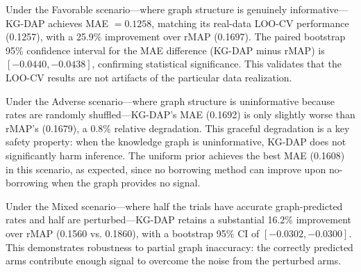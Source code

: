 \documentclass[12pt]{article}
\begin{document}
Under the Favorable scenario---where graph structure is genuinely informative---KG-DAP achieves MAE $= 0.1258$, matching its real-data LOO-CV performance (0.1257), with a 25.9\% improvement over rMAP (0.1697). The paired bootstrap 95\% confidence interval for the MAE difference (KG-DAP minus rMAP) is $[-0.0440, -0.0438]$, confirming statistical significance. This validates that the LOO-CV results are not artifacts of the particular data realization.

Under the Adverse scenario---where graph structure is uninformative because rates are randomly shuffled---KG-DAP's MAE (0.1692) is only slightly worse than rMAP's (0.1679), a 0.8\% relative degradation. This graceful degradation is a key safety property: when the knowledge graph is uninformative, KG-DAP does not significantly harm inference. The uniform prior achieves the best MAE (0.1608) in this scenario, as expected, since no borrowing method can improve upon no-borrowing when the graph provides no signal.

Under the Mixed scenario---where half the trials have accurate graph-predicted rates and half are perturbed---KG-DAP retains a substantial 16.2\% improvement over rMAP (0.1560 vs. 0.1860), with a bootstrap 95\% CI of $[-0.0302, -0.0300]$. This demonstrates robustness to partial graph inaccuracy: the correctly predicted arms contribute enough signal to overcome the noise from the perturbed arms.
\end{document}
